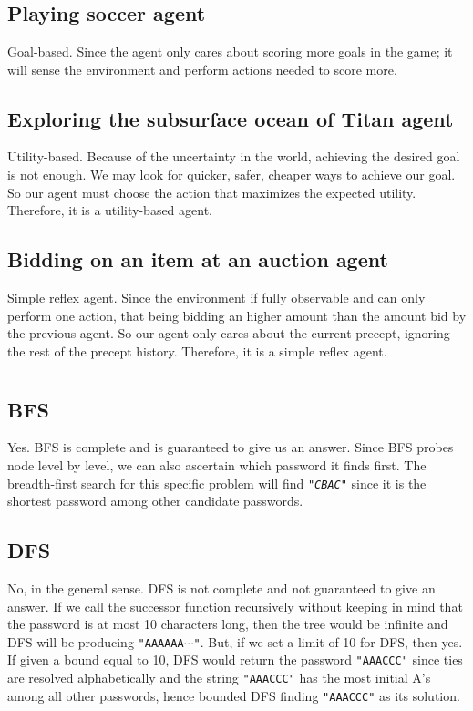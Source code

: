 \documentclass{article}
\begin{document}
    \section{}
    \subsection{Playing soccer agent}
    Goal-based. Since the agent only cares about scoring more goals in the game; it will sense the environment and perform actions needed to score more.
    \subsection{Exploring the subsurface ocean of Titan agent}
    Utility-based. Because of the uncertainty in the world, achieving the desired goal is not enough. We may look for quicker, safer, cheaper ways to achieve our goal. So our agent must choose the action that maximizes the expected utility. Therefore, it is a utility-based agent.
    \subsection{Bidding on an item at an auction agent}
    Simple reflex agent. Since the environment if fully observable and can only perform one action, that being bidding an higher amount than the amount bid by the previous agent. So our agent only cares about the current precept, ignoring the rest of the precept history. Therefore, it is a simple reflex agent.
    \bigskip
    \section{}
    \subsection{BFS}
    Yes. BFS is complete and is guaranteed to give us an answer. Since BFS probes node level by level, we can also ascertain which password it finds first. The breadth-first search for this specific problem will find \texttt{\textit{"CBAC"}} since it is the shortest password among other candidate passwords.
    \subsection{DFS}
    No, in the general sense. DFS is not complete and not guaranteed to give an answer.  If we call the successor function recursively without keeping in mind that the password is at most 10 characters long, then the tree would be infinite and DFS will be producing \texttt{"AAAAAA$\cdots$"}. But, if we set a limit of 10 for DFS, then yes. If given a bound equal to 10, DFS would return the password \texttt{"AAACCC"} since ties are resolved alphabetically and the string \texttt{"AAACCC"} has the most initial A's among all other passwords, hence bounded DFS finding \texttt{"AAACCC"} as its solution.
\end{document}
